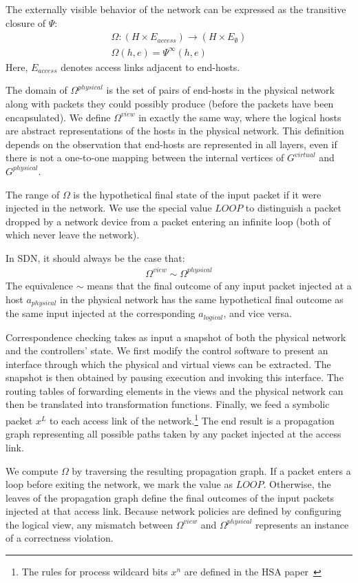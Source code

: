 {The externally visible behavior of the network can be expressed as the
transitive closure of $\Psi$:
\begin{align*}
\Omega: (H \times E_{access}) \rightarrow (H \times E_{\emptyset}) \\
\Omega(h,e) = \Psi^{\infty}(h,e)
\end{align*}
Here, $E_{access}$ denotes access links adjacent to end-hosts.

The domain of $\Omega^{physical}$ is the set of pairs of end-hosts in the
physical network along with packets they could possibly produce (before
the packets have been encapsulated). We define $\Omega^{view}$ in exactly the same way, where
the logical hosts are abstract representations of the hosts in the physical
network. This definition depends on the observation that end-hosts are represented
in all layers, even if there is not a one-to-one mapping between the
internal vertices of $G^{virtual}$ and $G^{physical}$.

The range of $\Omega$ is the hypothetical final state of the
input packet if it were injected in the network.
We use the special value $LOOP$ to distinguish
a packet dropped by a network device from a packet entering an
infinite loop (both of which never leave the network).

In SDN, it should always be the case that:
\begin{align*}
\Omega^{view} \sim \Omega^{physical}
\end{align*}
The equivalence $\sim$ means that the final outcome of any input packet
injected at a host $a_{physical}$ in the physical network has the same hypothetical final outcome as
the same input injected at the corresponding $a_{logical}$, and vice versa.

Correspondence checking takes as input a
snapshot of both the physical network and the
controllers' state. We first modify the control software to present an
interface through which the physical and virtual views can be
extracted. The snapshot is
then obtained by pausing execution and invoking this interface.
The routing tables of forwarding elements in the views and the physical
network can then be translated into transformation functions.
Finally, we feed a symbolic packet $x^L$ to each access link of the
network.\footnote{The rules for process wildcard bits $x^n$ are defined in
the HSA paper~\cite{hsa}} The end result is a propagation graph representing
all possible paths taken by any packet injected
at the access link.

We compute $\Omega$ by traversing the resulting propagation graph. If a packet
enters a loop before exiting the network, we mark the value as
$LOOP$. Otherwise,
the leaves of the propagation graph define the final outcomes of the input
packets injected at that access link. Because network policies are defined by
configuring the logical view, any mismatch between $\Omega^{view}$ and $\Omega^{physical}$
represents an instance of a correctness violation.

}
